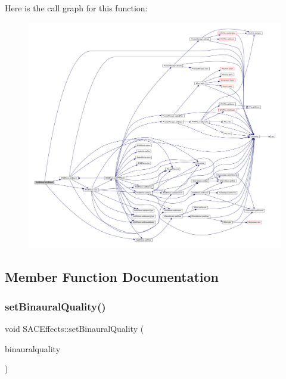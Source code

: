 Here is the call graph for this function\+:
\nopagebreak
\begin{figure}[H]
\begin{center}
\leavevmode
\includegraphics[width=350pt]{class_s_a_c_effects_aad64fe6a36a53d1ffeae59bccbd8af33_cgraph}
\end{center}
\end{figure}


\subsection{Member Function Documentation}
\mbox{\label{class_s_a_c_effects_aa0b1fa3cd01ea58fd6ae155dd3b12566}} 
\subsubsection{\texorpdfstring{set\+Binaural\+Quality()}{setBinauralQuality()}}
{\footnotesize\ttfamily void S\+A\+C\+Effects\+::set\+Binaural\+Quality (\begin{DoxyParamCaption}\item[{\hyperlink{struct_binaural_quality_a3a009a287684c778dbb5507226cf24e4}{Binaural\+Quality\+::binauralquality}}]{binauralquality }\end{DoxyParamCaption})}


